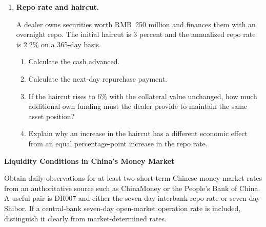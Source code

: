 \begin{enumerate}
\begin{enumerate}

\item Calculate the spread over the benchmark.

\item Suppose the benchmark rises to 3.4\% and the spread widens to 1.6 percentage points. What is the new commercial-paper rate?

\item Separate the increase in the funding rate into the benchmark component and the spread component.

\item Give two economic reasons why the spread could widen.

\end{enumerate}

\item \textbf{Repo rate and haircut.}

A dealer owns securities worth RMB~250 million and finances them with an overnight repo. The initial haircut is 3 percent and the annualized repo rate is 2.2\% on a 365-day basis.

\begin{enumerate}

\item Calculate the cash advanced.

\item Calculate the next-day repurchase payment.

\item If the haircut rises to 6\% with the collateral value unchanged, how much additional own funding must the dealer provide to maintain the same asset position?

\item Explain why an increase in the haircut has a different economic effect from an equal percentage-point increase in the repo rate.

\end{enumerate}

\end{enumerate}



\textbf{Liquidity Conditions in China's Money Market}

Obtain daily observations for at least two short-term Chinese money-market rates from an authoritative source such as ChinaMoney or the People's Bank of China. A useful pair is DR007 and either the seven-day interbank repo rate or seven-day Shibor. If a central-bank seven-day open-market operation rate is included, distinguish it clearly from market-determined rates.

